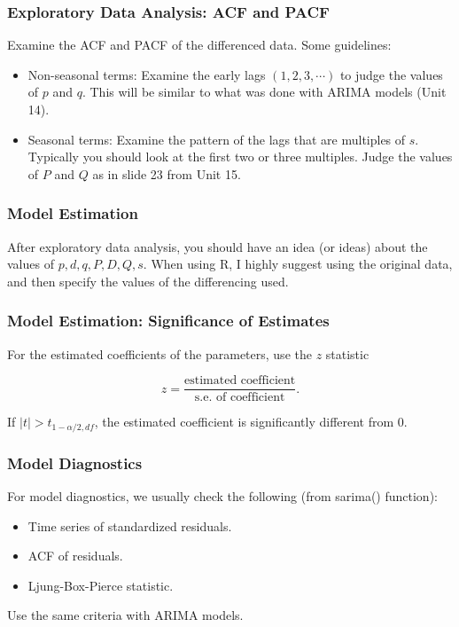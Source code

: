 \documentclass[%
xcolor=pdftex]{beamer}
\begin{document}
\begin{frame}
\frametitle{Exploratory Data Analysis: ACF and PACF}

Examine the ACF and PACF of the differenced data. Some guidelines:

\begin{itemize}
\item Non-seasonal terms: Examine the early lags $(1, 2, 3, \cdots)$ to judge the values of $p$ and $q$. This will be similar to what was done with ARIMA models (Unit 14).
\item Seasonal terms: Examine the pattern of the lags that are multiples of $s$. Typically you should look at the first two or three multiples. Judge the values of $P$ and $Q$ as in slide 23 from Unit 15.
\end{itemize}

\end{frame}

\begin{frame}
\frametitle{Model Estimation}

After exploratory data analysis, you should have an idea (or ideas) about the values of $p, d, q, P, D, Q, s$. When using R, I highly suggest using the original data, and then specify the values of the differencing used.

\end{frame}

\begin{frame}
\frametitle{Model Estimation: Significance of Estimates}

For the estimated coefficients of the parameters, use the $z$ statistic

$$
z = \frac{\mbox{estimated coefficient}}{\mbox{s.e. of coefficient}}.
$$

If $|t| > t_{1 - \alpha/2, df}$, the estimated coefficient is significantly different from 0.

\end{frame}

\begin{frame}
\frametitle{Model Diagnostics}

For model diagnostics, we usually check the following (from sarima() function):

\begin{itemize}
\item Time series of standardized residuals.
\item ACF of residuals.
\item Ljung-Box-Pierce statistic.
\end{itemize}

Use the same criteria with ARIMA models.

\end{frame}
\end{document}
